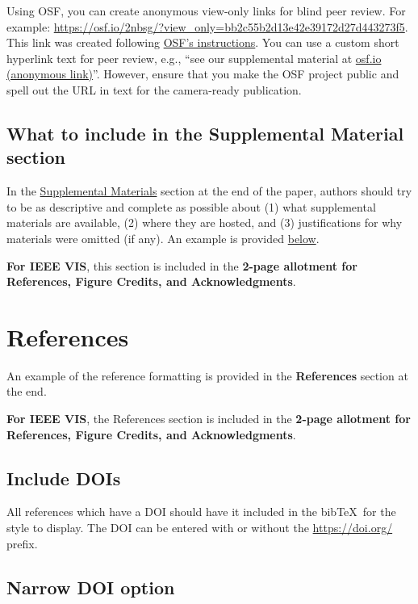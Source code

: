 \documentclass[journal]{vgtc}                %
\begin{document}
Using OSF, you can create anonymous view-only links for blind peer review.
For example: \url{https://osf.io/2nbsg/?view_only=bb2c55b2d13e42e39172d27d443273f5}.
This link was created following \href{https://help.osf.io/article/201-create-a-view-only-link-for-a-project}{OSF's instructions}.
You can use a custom short hyperlink text for peer review, e.g., ``see our supplemental material at \href{https://osf.io/2nbsg/?view_only=bb2c55b2d13e42e39172d27d443273f5}{osf.io (anonymous link)}''.
However, ensure that you make the OSF project public and spell out the URL in text for the camera-ready publication.


\subsection{What to include in the Supplemental Material section}

In the \hyperref[sec:supplemental_materials]{Supplemental Materials} section at the end of the paper, authors should try to be as descriptive and complete as possible about (1) what supplemental materials are available, (2) where they are hosted, and (3) justifications for why materials were omitted (if any).
An example is provided \hyperref[sec:supplemental_materials]{below}.

\textbf{For IEEE VIS}, this section is included in the \textbf{2-page allotment for References, Figure Credits, and Acknowledgments}.


\section{References}
\label{sec:references_inst}

An example of the reference formatting is provided in the \textbf{References} section at the end.

\textbf{For IEEE VIS}, the References section is included in the \textbf{2-page allotment for References, Figure Credits, and Acknowledgments}.

\subsection{Include DOIs}

All references which have a DOI should have it included in the bib\TeX\ for the style to display.
The DOI can be entered with or without the \url{https://doi.org/} prefix.

\subsection{Narrow DOI option}
\end{document}

